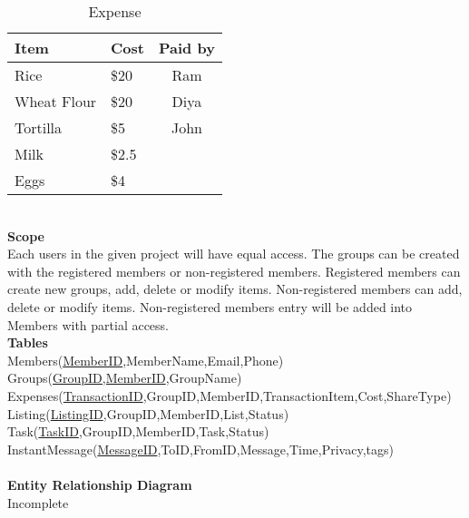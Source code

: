 \documentclass[11]{article}
\begin{document}
\begin{table}[h] %
\begin{center}
\caption{Expense }
	\begin{tabular}{| l | l | c |} %
	\hline
	Item & Cost & Paid by \\  %
	\hline
	Rice & \$20 & Ram \\  %
	\hline
		Wheat Flour & \$20 & Diya \\  %
	\hline
		Tortilla & \$5 & John \\  %
	\hline
		Milk & \$2.5 & \\  %
	\hline
		Eggs &  \$4 & \\  %
	\hline
	\end{tabular}
\end{center}
\end{table}
\ \\
\noindent \textbf{Scope} \\
Each users in the given project will have equal access. The groups can be created with the registered members or non-registered members. Registered members can create new groups, add, delete or modify items. Non-registered members can add, delete or modify items. Non-registered members entry will be added into Members with partial access.
\ \\
\noindent \textbf{Tables} \\
Members(\underline{MemberID},MemberName,Email,Phone) \\
Groups(\underline{GroupID,MemberID},GroupName) \\
Expenses(\underline{TransactionID},GroupID,MemberID,TransactionItem,Cost,ShareType) \\
Listing(\underline{ListingID},GroupID,MemberID,List,Status) \\
Task(\underline{TaskID},GroupID,MemberID,Task,Status) \\
InstantMessage(\underline{MessageID},ToID,FromID,Message,Time,Privacy,tags) \\
\ \\
\noindent \textbf{Entity Relationship Diagram} \\
{\color{red}Incomplete }
\end{document}
